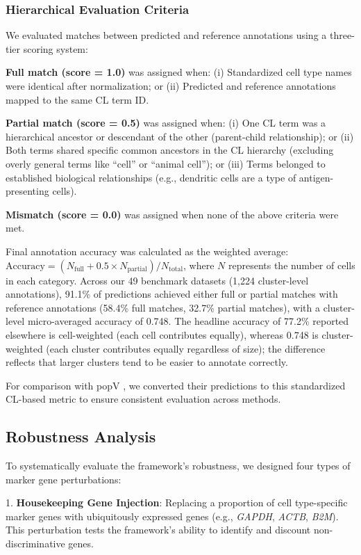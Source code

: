 \documentclass[pdflatex,sn-nature]{sn-jnl}%
\theoremstyle{thmstyleone}%
\theoremstyle{thmstyletwo}%
\theoremstyle{thmstylethree}%
\begin{document}
\subsubsection{Hierarchical Evaluation Criteria}
We evaluated matches between predicted and reference annotations using a three-tier scoring system:

\textbf{Full match (score = 1.0)} was assigned when: (i) Standardized cell type names were identical after normalization; or (ii) Predicted and reference annotations mapped to the same CL term ID.

\textbf{Partial match (score = 0.5)} was assigned when: (i) One CL term was a hierarchical ancestor or descendant of the other (parent-child relationship); or (ii) Both terms shared specific common ancestors in the CL hierarchy (excluding overly general terms like ``cell'' or ``animal cell''); or (iii) Terms belonged to established biological relationships (e.g., dendritic cells are a type of antigen-presenting cells).

\textbf{Mismatch (score = 0.0)} was assigned when none of the above criteria were met.

Final annotation accuracy was calculated as the weighted average: $\text{Accuracy} = (N_\text{full} + 0.5 \times N_\text{partial}) / N_\text{total}$, where $N$ represents the number of cells in each category. Across our 49 benchmark datasets (1,224 cluster-level annotations), 91.1\% of predictions achieved either full or partial matches with reference annotations (58.4\% full matches, 32.7\% partial matches), with a cluster-level micro-averaged accuracy of 0.748. The headline accuracy of 77.2\% reported elsewhere is cell-weighted (each cell contributes equally), whereas 0.748 is cluster-weighted (each cluster contributes equally regardless of size); the difference reflects that larger clusters tend to be easier to annotate correctly.

For comparison with popV \cite{ergenConsensusPredictionCell2024}, we converted their predictions to this standardized CL-based metric to ensure consistent evaluation across methods.

\subsection{Robustness Analysis}
To systematically evaluate the framework's robustness, we designed four types of marker gene perturbations:

1. \textbf{Housekeeping Gene Injection}: Replacing a proportion of cell type-specific marker genes with ubiquitously expressed genes (e.g., \textit{GAPDH}, \textit{ACTB}, \textit{B2M}). This perturbation tests the framework's ability to identify and discount non-discriminative genes.
\end{document}
